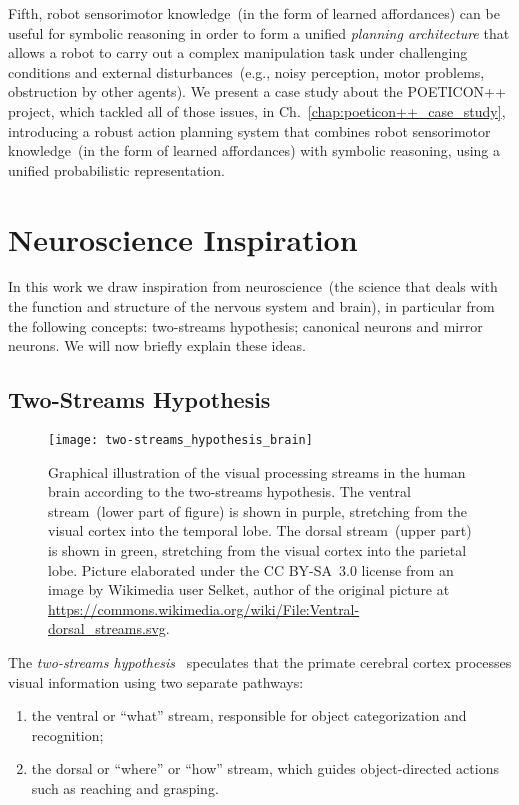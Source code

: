 Fifth, robot sensorimotor knowledge~(in the form of learned affordances) can be useful for symbolic reasoning in order to form a unified \emph{planning architecture} that allows a robot to carry out a complex manipulation task under challenging conditions and external disturbances~(e.g., noisy perception, motor problems, obstruction by other agents).
We present a case study about the POETICON++ project, which tackled all of those issues, in Ch.~\ref{chap:poeticon++_case_study}, introducing a robust action planning system that combines robot sensorimotor knowledge~(in the form of learned affordances) with symbolic reasoning, using a unified probabilistic representation.

\section{Neuroscience Inspiration}
\label{sec:motivation:neuro}

In this work we draw inspiration from neuroscience~(the science that deals with the function and structure of the nervous system and brain), in particular from the following concepts:
two-streams hypothesis; \allowbreak
canonical neurons and mirror neurons.
We will now briefly explain these ideas.

\subsection{Two-Streams Hypothesis}
\label{sec:motivation:neuro:twostreams}

\begin{figure}
\centering
\texttt{[image: two-streams\_hypothesis\_brain]}
\caption[Graphical illustration of the visual processing streams in the human brain according to the two-streams hypothesis.]{Graphical illustration of the visual processing streams in the human brain according to the two-streams hypothesis.
The ventral stream~(lower part of figure) is shown in purple, stretching from the visual cortex into the temporal lobe.
The dorsal stream~(upper part) is shown in green, stretching from the visual cortex into the parietal lobe.
Picture elaborated under the CC BY-SA~3.0 license from an image by Wikimedia user Selket, author of the original picture at \url{https://commons.wikimedia.org/wiki/File:Ventral-dorsal_streams.svg}.}
\label{fig:two-streams_brain}
\end{figure}

The \emph{two-streams hypothesis}~\cite{goodale_milner:1992,chao:2000:neuro} speculates that the primate cerebral cortex processes visual information using two separate pathways:
\begin{enumerate}
\item the ventral or ``what'' stream, responsible for object categorization and recognition;

\item the dorsal or ``where'' or ``how'' stream, which guides object-directed actions such as reaching and grasping.
\end{enumerate}

